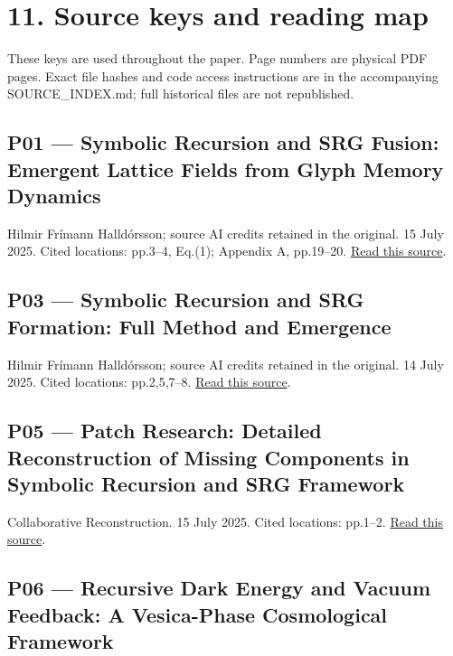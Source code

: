 \documentclass[11pt,a4paper]{article}
\begin{document}
\clearpage
\section*{11. Source keys and reading map}

These keys are used throughout the paper. Page numbers are physical PDF pages. Exact file hashes and code access instructions are in the accompanying SOURCE\_\allowbreak{}INDEX.md; full historical files are not republished.


\subsection*{P01 --- Symbolic Recursion and SRG Fusion: Emergent Lattice Fields from Glyph Memory Dynamics}

Hilmir Frímann Halldórsson; source AI credits retained in the original. 15 July 2025. Cited locations: pp.3--4, Eq.(1); Appendix A, pp.19--20. \href{https://zenodo.org/records/17253999/files/1.Symbolic\%20Recursion\%20and\%20SRG\%20Fusion.pdf}{Read this source}.


\subsection*{P03 --- Symbolic Recursion and SRG Formation: Full Method and Emergence}

Hilmir Frímann Halldórsson; source AI credits retained in the original. 14 July 2025. Cited locations: pp.2,5,7--8. \href{https://zenodo.org/records/17253999/files/3.Symbolic\%20Recursion\%20and\%20SRG\%20Formation\%20Full\%20Method\%20and\%20Emergence.pdf}{Read this source}.


\subsection*{P05 --- Patch Research: Detailed Reconstruction of Missing Components in Symbolic Recursion and SRG Framework}

Collaborative Reconstruction. 15 July 2025. Cited locations: pp.1--2. \href{https://zenodo.org/records/17253999/files/patch_research.pdf}{Read this source}.


\subsection*{P06 --- Recursive Dark Energy and Vacuum Feedback: A Vesica-Phase Cosmological Framework}
\end{document}

